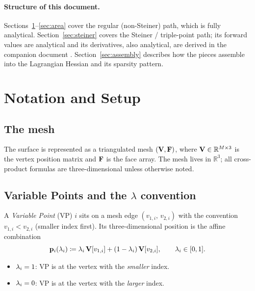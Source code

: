 \documentclass[11pt,a4paper]{article}
\begin{document}
\paragraph{Structure of this document.}
Sections~\ref{sec:notation}--\ref{sec:area} cover the regular (non-Steiner)
path, which is fully analytical.  Section~\ref{sec:steiner} covers the
Steiner / triple-point path; its forward values are analytical and its
derivatives, also analytical, are derived in the companion document
.
Section~\ref{sec:assembly} describes how the pieces assemble into the
Lagrangian Hessian and its sparsity pattern.

\section{Notation and Setup}
\label{sec:notation}

\subsection{The mesh}

The surface is represented as a triangulated mesh $(\mathbf{V}, \mathbf{F})$, where
$\mathbf{V} \in \mathbb{R}^{M \times 3}$ is the vertex position matrix and $\mathbf{F}$
is the face array.  The mesh lives in $\mathbb{R}^3$; all cross-product
formulas are three-dimensional unless otherwise noted.

\subsection{Variable Points and the $\lambda$ convention}
\label{sec:lambda-convention}

A \emph{Variable Point} (VP) $i$ sits on a mesh edge $(v_{1,i},\, v_{2,i})$
with the convention $v_{1,i} < v_{2,i}$ (smaller index first).  Its
three-dimensional position is the affine combination
\begin{equation}
  \mathbf{p}_{i}(\lambda_i)
    \coloneqq \lambda_i\, \mathbf{V}[v_{1,i}] + (1 - \lambda_i)\, \mathbf{V}[v_{2,i}],
  \qquad \lambda_i \in [0,1].
  \label{eq:vp-position}
\end{equation}
\begin{itemize}[noitemsep]
  \item $\lambda_i = 1$: VP is at the vertex with the \emph{smaller} index.
  \item $\lambda_i = 0$: VP is at the vertex with the \emph{larger} index.
\end{itemize}
\end{document}
